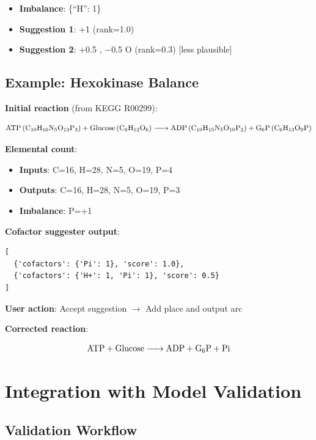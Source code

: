 \begin{itemize}
    \item \textbf{Imbalance}: \{``H'': 1\}
    \item \textbf{Suggestion 1}: +1  (rank=1.0)
    \item \textbf{Suggestion 2}: +0.5 , $-$0.5 O (rank=0.3) [less plausible]
\end{itemize}

\subsection{Example: Hexokinase Balance}
\label{subsec:hexokinase-balance-example}

\textbf{Initial reaction} (from KEGG R00299):

\begin{equation}
\ce{ATP (C10H16N5O13P3) + Glucose (C6H12O6) -> ADP (C10H15N5O10P2) + G6P (C6H13O9P)}
\end{equation}

\textbf{Elemental count}:

\begin{itemize}
    \item \textbf{Inputs}: C=16, H=28, N=5, O=19, P=4
    \item \textbf{Outputs}: C=16, H=28, N=5, O=19, P=3
    \item \textbf{Imbalance}: P=+1
\end{itemize}

\textbf{Cofactor suggester output}:

\begin{verbatim}
[
  {'cofactors': {'Pi': 1}, 'score': 1.0},
  {'cofactors': {'H+': 1, 'Pi': 1}, 'score': 0.5}
]
\end{verbatim}

\textbf{User action}: Accept suggestion $\to$ Add  place and output arc

\textbf{Corrected reaction}:

\begin{equation}
\ce{ATP + Glucose -> ADP + G6P + Pi}
\end{equation}

\section{Integration with Model Validation}
\label{sec:kegg-validation-integration}

\subsection{Validation Workflow}
\label{subsec:kegg-validation-workflow}

